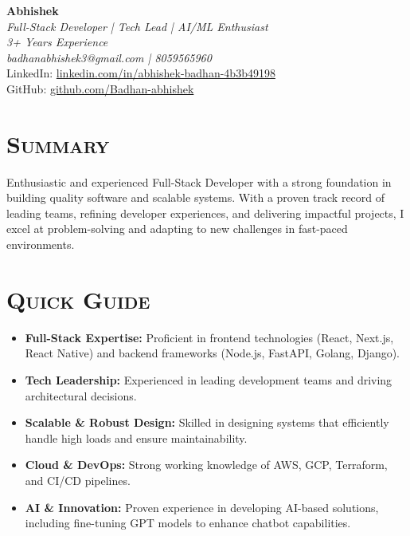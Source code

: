 \documentclass[a4paper,10pt]{article}
\newcommand{\resumesection}[1]{\section*{\scshape{#1}}}
\begin{document}
\begin{center}
    \textbf{\Huge Abhishek} \\
    \vspace{0.1cm}
    \textit{Full-Stack Developer | Tech Lead | AI/ML Enthusiast} \\
    \vspace{0.1cm}
    \textit{3+ Years Experience} \\
    \vspace{0.1cm}
    \textit{badhanabhishek3@gmail.com | 8059565960} \\
    LinkedIn: \href{https://www.linkedin.com/in/abhishek-badhan-4b3b49198/}{linkedin.com/in/abhishek-badhan-4b3b49198} \\
    GitHub: \href{https://github.com/Badhan-abhishek}{github.com/Badhan-abhishek} \\
\end{center}

\resumesection{Summary}
Enthusiastic and experienced Full-Stack Developer with a strong foundation in building quality software and scalable systems. With a proven track record of leading teams, refining developer experiences, and delivering impactful projects, I excel at problem-solving and adapting to new challenges in fast-paced environments.

\resumesection{Quick Guide}
\begin{itemize}[leftmargin=0.5cm]
    \item \textbf{Full-Stack Expertise:} Proficient in frontend technologies (React, Next.js, React Native) and backend frameworks (Node.js, FastAPI, Golang, Django).
    \item \textbf{Tech Leadership:} Experienced in leading development teams and driving architectural decisions.
    \item \textbf{Scalable \& Robust Design:} Skilled in designing systems that efficiently handle high loads and ensure maintainability.
    \item \textbf{Cloud \& DevOps:} Strong working knowledge of AWS, GCP, Terraform, and CI/CD pipelines.
    \item \textbf{AI \& Innovation:} Proven experience in developing AI-based solutions, including fine-tuning GPT models to enhance chatbot capabilities.
\end{itemize}
\end{document}
